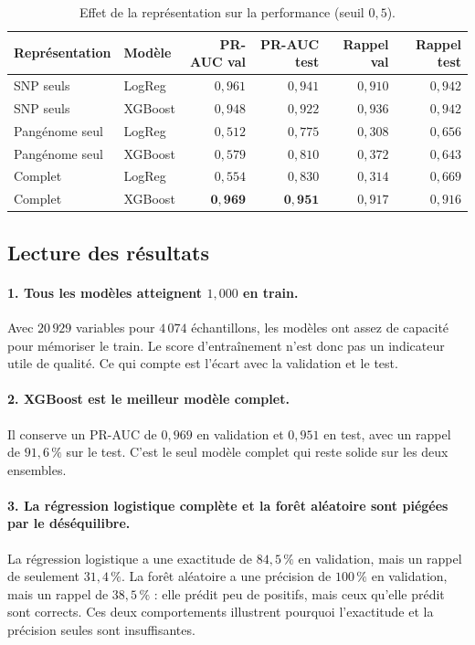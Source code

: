 \documentclass[11pt,a4paper]{article}
\begin{document}
\begin{table}[H]
\centering
\caption{Effet de la représentation sur la performance (seuil $0{,}5$).}
\label{tab:results_features}
\small
\begin{tabular}{llrrrr}
\toprule
\textbf{Représentation} & \textbf{Modèle} & \textbf{PR-AUC val} & \textbf{PR-AUC test} & \textbf{Rappel val} & \textbf{Rappel test} \\
\midrule
SNP seuls & LogReg & $0{,}961$ & $0{,}941$ & $0{,}910$ & $0{,}942$ \\
SNP seuls & XGBoost & $0{,}948$ & $0{,}922$ & $0{,}936$ & $0{,}942$ \\
Pangénome seul & LogReg & $0{,}512$ & $0{,}775$ & $0{,}308$ & $0{,}656$ \\
Pangénome seul & XGBoost & $0{,}579$ & $0{,}810$ & $0{,}372$ & $0{,}643$ \\
Complet & LogReg & $0{,}554$ & $0{,}830$ & $0{,}314$ & $0{,}669$ \\
Complet & XGBoost & $\mathbf{0{,}969}$ & $\mathbf{0{,}951}$ & $0{,}917$ & $0{,}916$ \\
\bottomrule
\end{tabular}
\end{table}

\subsection{Lecture des résultats}

\paragraph{1. Tous les modèles atteignent $1{,}000$ en train.}
Avec $20\,929$ variables pour $4\,074$ échantillons, les modèles ont assez de capacité pour mémoriser le train. Le score d'entraînement n'est donc pas un indicateur utile de qualité. Ce qui compte est l'écart avec la validation et le test.

\paragraph{2. XGBoost est le meilleur modèle complet.}
Il conserve un PR-AUC de $0{,}969$ en validation et $0{,}951$ en test, avec un rappel de $91{,}6\,\%$ sur le test. C'est le seul modèle complet qui reste solide sur les deux ensembles.

\paragraph{3. La régression logistique complète et la forêt aléatoire sont piégées par le déséquilibre.}
La régression logistique a une exactitude de $84{,}5\,\%$ en validation, mais un rappel de seulement $31{,}4\,\%$. La forêt aléatoire a une précision de $100\,\%$ en validation, mais un rappel de $38{,}5\,\%$ : elle prédit peu de positifs, mais ceux qu'elle prédit sont corrects. Ces deux comportements illustrent pourquoi l'exactitude et la précision seules sont insuffisantes.
\end{document}
